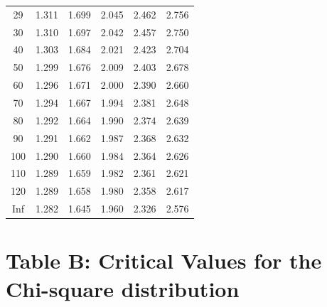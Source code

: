 \documentclass[
]{book}
\theoremstyle{definition}
\theoremstyle{definition}
\theoremstyle{definition}
\theoremstyle{definition}
\theoremstyle{remark}
\begin{document}
\begin{longtable}[]{@{}cccccc@{}}
29 & 1.311 & 1.699 & 2.045 & 2.462 & 2.756 \\
30 & 1.310 & 1.697 & 2.042 & 2.457 & 2.750 \\
40 & 1.303 & 1.684 & 2.021 & 2.423 & 2.704 \\
50 & 1.299 & 1.676 & 2.009 & 2.403 & 2.678 \\
60 & 1.296 & 1.671 & 2.000 & 2.390 & 2.660 \\
70 & 1.294 & 1.667 & 1.994 & 2.381 & 2.648 \\
80 & 1.292 & 1.664 & 1.990 & 2.374 & 2.639 \\
90 & 1.291 & 1.662 & 1.987 & 2.368 & 2.632 \\
100 & 1.290 & 1.660 & 1.984 & 2.364 & 2.626 \\
110 & 1.289 & 1.659 & 1.982 & 2.361 & 2.621 \\
120 & 1.289 & 1.658 & 1.980 & 2.358 & 2.617 \\
Inf & 1.282 & 1.645 & 1.960 & 2.326 & 2.576 \\
\end{longtable}

\hypertarget{table-b-critical-values-for-the-chi-square-distribution}{%
\section*{Table B: Critical Values for the Chi-square distribution}\label{table-b-critical-values-for-the-chi-square-distribution}}
\end{document}
